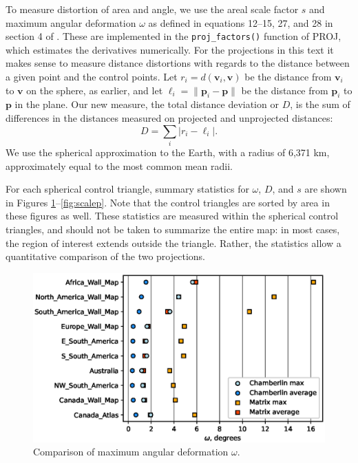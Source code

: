 \documentclass[]{interact}
\begin{document}
To measure distortion of area and angle, we use the areal scale factor $s$ and
maximum angular deformation $\omega$ as defined in equations 12--15, 27, and 28
in section 4 of \citet{snyder87}. These are implemented in the
\verb|proj_factors()| function of PROJ, which estimates the derivatives
numerically. For the projections in this text it makes sense to measure distance
distortions with regards to the distance between a given point and the control
points. Let $r_i = d(\mathbf v_i, \mathbf v)$ be the distance from
$\mathbf v_i$ to $\mathbf v$ on the sphere, as earlier, and let
$\ell_i = \|\mathbf p_i - \mathbf p\|$ be the distance from $\mathbf p_i$ to
$\mathbf p$ in the plane.
Our new measure, the total distance deviation or $D$, is the sum of
differences in the distances measured on projected and unprojected distances:
\begin{equation}
 D = \sum_i \left| r_i - \ell_i \right|.
\end{equation}
We use the spherical approximation to the Earth, with a radius of 6,371 km,
approximately equal to the most common mean radii. \citep{snyder87}

For each spherical control triangle, summary statistics for $\omega$, $D$, and
$s$ are shown in Figures \ref{fig:omegap}--\ref{fig:scalep}. Note that the
control triangles are sorted by area in these figures as well.
These statistics are measured within the spherical control triangles,
and should not be taken to summarize the entire map: in most cases,
the region of interest extends outside the triangle.
Rather, the statistics allow a quantitative comparison of the two projections.

\begin{figure}
  \includegraphics[width=\textwidth]{omegaplot}
  \caption{Comparison of maximum angular deformation $\omega$.}
  \label{fig:omegap}
\end{figure}
\end{document}
